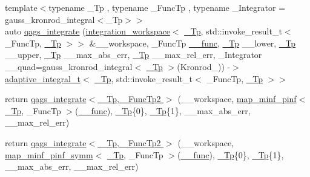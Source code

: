 \begin{DoxyCompactItemize}
\item 
{\footnotesize template$<$typename \+\_\+\+Tp , typename \+\_\+\+Func\+Tp , typename \+\_\+\+Integrator  = gauss\+\_\+kronrod\+\_\+integral$<$\+\_\+\+Tp$>$$>$ }\\auto \hyperlink{namespace____gnu__cxx_afde6c192a4e11d49f4c9c117277980ff}{qags\+\_\+integrate} (\hyperlink{class____gnu__cxx_1_1integration__workspace}{integration\+\_\+workspace}$<$ \hyperlink{namespace____gnu__cxx_a3b19a9c800ca194374ef9172290f7d79}{\+\_\+\+Tp}, std\+::invoke\+\_\+result\+\_\+t$<$ \+\_\+\+Func\+Tp, \hyperlink{namespace____gnu__cxx_a3b19a9c800ca194374ef9172290f7d79}{\+\_\+\+Tp} $>$$>$ \&\+\_\+\+\_\+workspace, \+\_\+\+Func\+Tp \hyperlink{namespace____gnu__cxx_af2b2f0c7a2ae72b922b1afefae5a65b2}{\+\_\+\+\_\+func}, \hyperlink{namespace____gnu__cxx_a3b19a9c800ca194374ef9172290f7d79}{\+\_\+\+Tp} \+\_\+\+\_\+lower, \hyperlink{namespace____gnu__cxx_a3b19a9c800ca194374ef9172290f7d79}{\+\_\+\+Tp} \+\_\+\+\_\+upper, \hyperlink{namespace____gnu__cxx_a3b19a9c800ca194374ef9172290f7d79}{\+\_\+\+Tp} \+\_\+\+\_\+max\+\_\+abs\+\_\+err, \hyperlink{namespace____gnu__cxx_a3b19a9c800ca194374ef9172290f7d79}{\+\_\+\+Tp} \+\_\+\+\_\+max\+\_\+rel\+\_\+err, \+\_\+\+Integrator \+\_\+\+\_\+quad=gauss\+\_\+kronrod\+\_\+integral$<$ \hyperlink{namespace____gnu__cxx_a3b19a9c800ca194374ef9172290f7d79}{\+\_\+\+Tp} $>$(Kronrod\+\_)) -\/$>$ \hyperlink{struct____gnu__cxx_1_1adaptive__integral__t}{adaptive\+\_\+integral\+\_\+t}$<$ \hyperlink{namespace____gnu__cxx_a3b19a9c800ca194374ef9172290f7d79}{\+\_\+\+Tp}, std\+::invoke\+\_\+result\+\_\+t$<$ \+\_\+\+Func\+Tp, \hyperlink{namespace____gnu__cxx_a3b19a9c800ca194374ef9172290f7d79}{\+\_\+\+Tp} $>$$>$
\item 
return \hyperlink{namespace____gnu__cxx_a8b6964018d33496542948228e467acb1}{qags\+\_\+integrate$<$ \+\_\+\+Tp, \+\_\+\+Func\+Tp2 $>$} (\+\_\+\+\_\+workspace, \hyperlink{struct____gnu__cxx_1_1map__minf__pinf}{map\+\_\+minf\+\_\+pinf}$<$ \hyperlink{namespace____gnu__cxx_a3b19a9c800ca194374ef9172290f7d79}{\+\_\+\+Tp}, \+\_\+\+Func\+Tp $>$(\hyperlink{namespace____gnu__cxx_af2b2f0c7a2ae72b922b1afefae5a65b2}{\+\_\+\+\_\+func}), \hyperlink{namespace____gnu__cxx_a3b19a9c800ca194374ef9172290f7d79}{\+\_\+\+Tp}\{0\}, \hyperlink{namespace____gnu__cxx_a3b19a9c800ca194374ef9172290f7d79}{\+\_\+\+Tp}\{1\}, \+\_\+\+\_\+max\+\_\+abs\+\_\+err, \+\_\+\+\_\+max\+\_\+rel\+\_\+err)
\item 
return \hyperlink{namespace____gnu__cxx_a454f1c38cacdbcfa8076d60f86a5f57d}{qags\+\_\+integrate$<$ \+\_\+\+Tp, \+\_\+\+Func\+Tp2 $>$} (\+\_\+\+\_\+workspace, \hyperlink{struct____gnu__cxx_1_1map__minf__pinf__symm}{map\+\_\+minf\+\_\+pinf\+\_\+symm}$<$ \hyperlink{namespace____gnu__cxx_a3b19a9c800ca194374ef9172290f7d79}{\+\_\+\+Tp}, \+\_\+\+Func\+Tp $>$(\hyperlink{namespace____gnu__cxx_af2b2f0c7a2ae72b922b1afefae5a65b2}{\+\_\+\+\_\+func}), \hyperlink{namespace____gnu__cxx_a3b19a9c800ca194374ef9172290f7d79}{\+\_\+\+Tp}\{0\}, \hyperlink{namespace____gnu__cxx_a3b19a9c800ca194374ef9172290f7d79}{\+\_\+\+Tp}\{1\}, \+\_\+\+\_\+max\+\_\+abs\+\_\+err, \+\_\+\+\_\+max\+\_\+rel\+\_\+err)

\end{DoxyCompactItemize}
